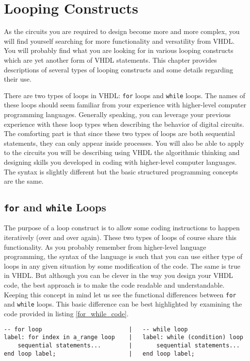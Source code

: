 %
%
%
\chapter{Looping Constructs}
As the circuits you are required to design become more and more complex, you will find yourself searching for more functionality and versatility from VHDL. You will probably find what you are looking for in various looping constructs which are yet another form of VHDL statements. This chapter provides descriptions of several types of looping constructs and some details regarding their use. 

There are two types of loops in VHDL: \texttt{for} loops and \texttt{while} loops. The names of these loops should seem familiar from your experience with higher-level computer programming languages. Generally speaking, you can leverage your previous experience with these loop types when describing the behavior of digital circuits. The comforting part is that since these two types of loops are both sequential statements, they can only appear inside processes. You will also be able to apply to the circuits you will be describing using VHDL the algorithmic thinking and designing skills you developed in coding with higher-level computer languages. The syntax is slightly different but the basic structured programming concepts are the same. 

\section{\texttt{for} and \texttt{while} Loops}
The purpose of a loop construct is to allow some coding instructions to happen iteratively (over and over again). These two types of loops of course share this functionality. As you probably remember from higher-level language programming, the syntax of the language is such that you can use either type of loops in any given situation by some modification of the code. The same is true in VHDL. But although you can be clever in the way you design your VHDL code, the best approach is to make the code readable and understandable. Keeping this concept in mind let us see the functional differences between \texttt{for} and \texttt{while} loops. This basic difference can be best highlighted by examining the code provided in listing \ref{for_while_code}.

\noindent
\begin{minipage}{1\linewidth}
\begin{lstlisting}[label=for_while_code, caption=The basic structure of the \texttt{for} and \texttt{while} loops.]
-- for loop							|	-- while loop
label: for index in a_range loop	|	label: while (condition) loop
	sequential statements...		|		sequential statements...
end loop label;						|	end loop label;
\end{lstlisting}
\end{minipage}

